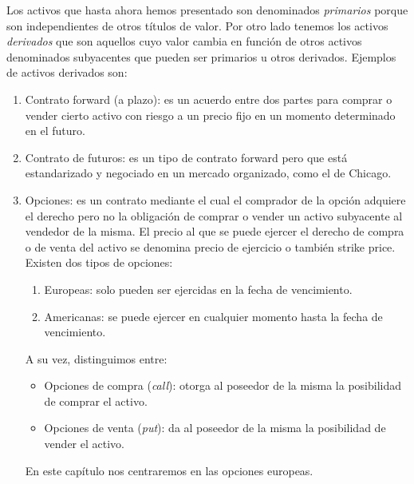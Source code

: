 Los activos que hasta ahora hemos presentado son denominados \textit{primarios} porque son independientes de otros títulos de valor. Por otro lado tenemos los activos \textit{derivados} que son aquellos cuyo valor cambia en función de otros activos denominados subyacentes que pueden ser primarios u otros derivados. Ejemplos de activos derivados son:
\begin{enumerate}
	\item Contrato forward (a plazo): es un acuerdo entre dos partes para comprar o vender cierto activo con riesgo a un precio fijo en un momento determinado en el futuro. 
	\item Contrato de futuros: es un tipo de contrato forward pero que está estandarizado y negociado en un mercado organizado, como el de Chicago.
	\item Opciones: es un contrato mediante el cual el comprador de la opción adquiere el derecho pero no la obligación de comprar o vender un activo subyacente al vendedor de la misma. El precio al que se puede ejercer el derecho de compra o de venta del activo se denomina precio de ejercicio o también strike price. Existen dos tipos de opciones: 
	\begin{enumerate}
		\item Europeas: solo pueden ser ejercidas en la fecha de vencimiento.
		\item Americanas:  se puede ejercer en cualquier momento hasta la fecha de vencimiento.
	\end{enumerate}
	A su vez, distinguimos entre:
	\begin{itemize}
		\item Opciones de compra (\textit{call}): otorga al poseedor de la misma la posibilidad de comprar el activo.
		\item Opciones de venta (\textit{put}): da al poseedor de la misma la posibilidad de vender el activo.
	\end{itemize}
	
	En este capítulo nos centraremos en las opciones europeas. 
\end{enumerate} 

